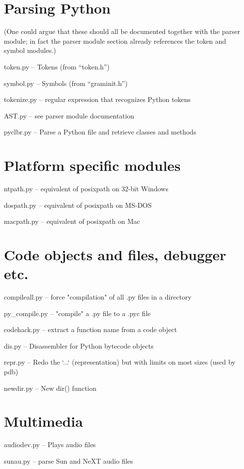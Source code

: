 \section{Parsing Python}

(One could argue that these should all be documented together with the
parser module; in fact the parser module section already references
the token and symbol modules.)

token.py -- Tokens (from ``token.h'')

symbol.py -- Symbols (from ``graminit.h'')

tokenize.py -- regular expression that recognizes Python tokens

AST.py -- see parser module documentation

pyclbr.py -- Parse a Python file and retrieve classes and methods


\section{Platform specific modules}

ntpath.py -- equivalent of posixpath on 32-bit Windows

dospath.py -- equivalent of posixpath on MS-DOS

macpath.py -- equivalent of posixpath on Mac


\section{Code objects and files, debugger etc.}

compileall.py -- force "compilation" of all .py files in a directory

py_compile.py -- "compile" a .py file to a .pyc file

codehack.py -- extract a function name from a code object

dis.py -- Disassembler for Python bytecode objects

repr.py -- Redo the `...` (representation) but with limits on most
sizes (used by pdb)

newdir.py -- New dir() function


\section{Multimedia}

audiodev.py -- Plays audio files

sunau.py -- parse Sun and NeXT audio files

